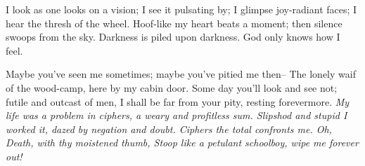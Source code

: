 \begin{poemblock}
 I look as one looks on a vision; I see it pulsating by;
  I glimpse joy-radiant faces; I hear the thresh of the wheel.
 Hoof-like my heart beats a moment; then silence swoops from the sky.
  Darkness is piled upon darkness.  God only knows how I feel.

 Maybe you've seen me sometimes; maybe you've pitied me then--
  The lonely waif of the wood-camp, here by my cabin door.
 Some day you'll look and see not; futile and outcast of men,
  I shall be far from your pity, resting forevermore.
\textit{
  My life was a problem in ciphers, a weary and profitless sum.
   Slipshod and stupid I worked it, dazed by negation and doubt.
  Ciphers the total confronts me.  Oh, Death, with thy moistened thumb,
   Stoop like a petulant schoolboy, wipe me forever out!
}
\end{poemblock}
